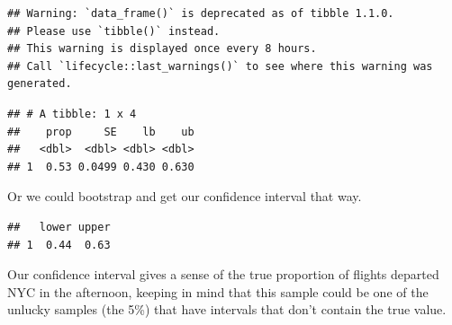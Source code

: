 \documentclass[
]{book}
\newenvironment{Shaded}{\begin{snugshade}}{\end{snugshade}}
\newcommand{\CommentTok}[1]{\textcolor[rgb]{0.56,0.35,0.01}{\textit{#1}}}
\newcommand{\DataTypeTok}[1]{\textcolor[rgb]{0.13,0.29,0.53}{#1}}
\newcommand{\DecValTok}[1]{\textcolor[rgb]{0.00,0.00,0.81}{#1}}
\newcommand{\FloatTok}[1]{\textcolor[rgb]{0.00,0.00,0.81}{#1}}
\newcommand{\KeywordTok}[1]{\textcolor[rgb]{0.13,0.29,0.53}{\textbf{#1}}}
\newcommand{\NormalTok}[1]{#1}
\newcommand{\OperatorTok}[1]{\textcolor[rgb]{0.81,0.36,0.00}{\textbf{#1}}}
\newcommand{\OtherTok}[1]{\textcolor[rgb]{0.56,0.35,0.01}{#1}}
\newcommand{\StringTok}[1]{\textcolor[rgb]{0.31,0.60,0.02}{#1}}
\begin{document}
\begin{verbatim}
## Warning: `data_frame()` is deprecated as of tibble 1.1.0.
## Please use `tibble()` instead.
## This warning is displayed once every 8 hours.
## Call `lifecycle::last_warnings()` to see where this warning was generated.
\end{verbatim}

\begin{verbatim}
## # A tibble: 1 x 4
##    prop     SE    lb    ub
##   <dbl>  <dbl> <dbl> <dbl>
## 1  0.53 0.0499 0.430 0.630
\end{verbatim}

Or we could bootstrap and get our confidence interval that way.

\begin{Shaded}
\end{Shaded}

\begin{verbatim}
##   lower upper
## 1  0.44  0.63
\end{verbatim}

Our confidence interval gives a sense of the true proportion of flights departed NYC in the afternoon, keeping in mind that this sample could be one of the unlucky samples (the 5\%) that have intervals that don't contain the true value.
\end{document}
